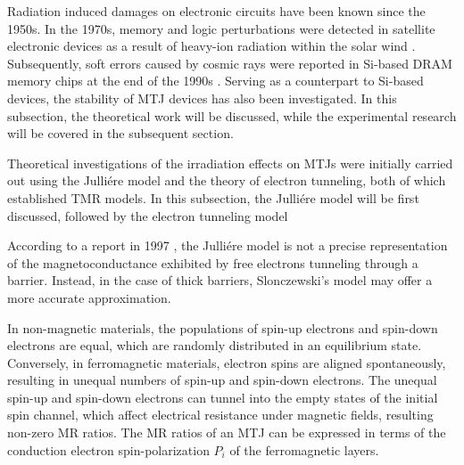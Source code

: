 \documentclass[molecules,review,submit,pdftex,moreauthors]{Definitions/mdpi}
\begin{document}
Radiation induced damages on electronic circuits have been known since the 1950s.  In the 1970s, memory and logic perturbations were detected in satellite electronic devices as a result of heavy-ion radiation within the solar wind \cite{Binder1975Satellite}.  Subsequently, soft errors caused by cosmic rays were reported in Si-based DRAM memory chips at the end of the 1990s \cite{Ziegler1998IEEE}.  Serving as a counterpart to Si-based devices, the stability of MTJ devices has also been investigated.  In this subsection, the theoretical work will be discussed, while the experimental research will be covered in the subsequent section.


Theoretical investigations of the irradiation effects on MTJs were initially carried out using the Julli\'{e}re model \cite{Julliere1975PLa} and the theory of electron tunneling, both of which established TMR models.  In this subsection, the Julli\'{e}re model will be first discussed, followed by the electron tunneling model 


According to a report in 1997 \cite{MacLaren1997PRB}, the Julli\'{e}re model is  not a precise representation of the magnetoconductance exhibited by free electrons tunneling through a  barrier.  Instead, in the case of thick barriers, Slonczewski's model may offer a more accurate approximation. 


In non-magnetic materials, the populations of spin-up electrons and spin-down electrons are equal, which are randomly distributed in an equilibrium state.  Conversely, in ferromagnetic materials, electron spins are aligned spontaneously, resulting in unequal numbers of spin-up and spin-down electrons.  The unequal spin-up and spin-down electrons can tunnel into the empty states of the initial spin channel, which affect electrical resistance under magnetic fields, resulting non-zero MR ratios.  The MR ratios of an MTJ can be expressed in terms of the conduction electron spin-polarization $P_i$ of the ferromagnetic layers. \cite{Julliere1975PLa,Soulen1998Science}
\end{document}
